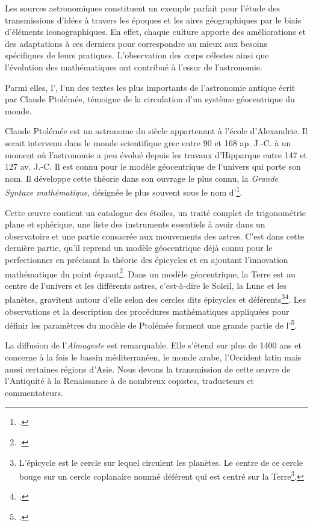 Les sources astronomiques constituent un exemple parfait pour l'étude des transmissions d'idées à travers les époques et les aires géographiques par le biais d'éléments iconographiques. En effet, chaque culture apporte des améliorations et des adaptations à ces derniers pour correspondre au mieux aux besoins spécifiques de leurs pratiques. L'observation des corps célestes ainsi que l'évolution des mathématiques ont contribué à l'essor de l'astronomie. 

Parmi elles, l'\almageste, l'un des textes les plus importants de l'astronomie antique écrit par Claude Ptolémée, témoigne de la circulation d'un système géocentrique du monde.

Claude Ptolémée est un astronome du \II siècle appartenant à l'école d'Alexandrie. Il serait intervenu dans le monde scientifique grec entre 90 et 168 ap. J.-C. à un moment où l'astronomie a peu évolué depuis les travaux d'Hipparque entre 147 et 127 av. J.-C. Il est connu pour le modèle géocentrique de l'univers qui porte son nom. Il développe cette théorie dans son ouvrage le plus connu, la \textit{Grande Syntaxe mathématique}, désignée le plus souvent sous le nom d'\almageste\footcite{verdetLaubeLastronomieLaurore1990}. 


Cette œuvre contient un catalogue des étoiles, un traité complet de trigonométrie plane et sphérique, une liste des instruments essentiels à avoir dans un observatoire et une partie consacrée aux mouvements des astres.
C'est dans cette dernière partie, qu'il reprend un modèle géocentrique déjà connu pour le perfectionner en précisant la théorie des épicycles et en ajoutant l'innovation mathématique du point équant\footcite{AstronomyAncientGreece2025}. 
Dans un modèle géocentrique, la Terre est au centre de l'univers et les différents astres, c'est-à-dire le Soleil, la Lune et les planètes, gravitent autour d'elle selon des cercles dits épicycles et déférents\footnote{L'épicycle est le cercle sur lequel circulent les planètes. Le centre de ce cercle bouge sur un cercle coplanaire nommé déférent qui est centré sur la Terre\footcite{EpicyclesPtolemee}.}\footcite{costabelCLAUDEPTOLEMEE90}.
Les observations et la description des procédures mathématiques appliquées pour définir les paramètres du modèle de Ptolémée forment une grande partie de l'\almageste\footcite{AstronomyAncientGreece2025}. 

La diffusion de l'\textit{Almageste} est remarquable. Elle s'étend sur plus de 1400 ans et concerne à la fois le bassin méditerranéen, le monde arabe, l'Occident latin mais aussi certaines régions d'Asie. 
Nous devons la transmission de cette œuvre de l'Antiquité à la Renaissance à de nombreux copistes, traducteurs et commentateurs. 

